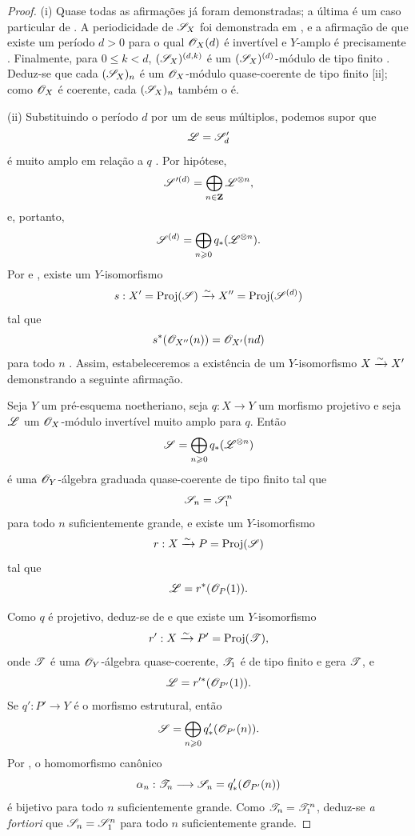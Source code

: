 \begin{proof}
(i) Quase todas as afirmações já foram demonstradas; a última é um caso particular de .
A periodicidade de $\mathscr{S}_X$ foi demonstrada em , e a afirmação de que existe um período $d>0$ para o qual $\mathscr{O}_X(d)$ é invertível e $Y$-amplo é precisamente .
Finalmente, para $0\leq k<d$, $(\mathscr{S}_X)^{(d,k)}$ é um $(\mathscr{S}_X)^{(d)}$-módulo de tipo finito .
Deduz-se que cada $(\mathscr{S}_X)_n$ é um $\mathscr{O}_X$-módulo quase-coerente de tipo finito [ii]; como $\mathscr{O}_X$ é coerente, cada $(\mathscr{S}_X)_n$ também o é.

(ii) Substituindo o período $d$ por um de seus múltiplos, podemos supor que
\[
  \mathscr{L}=\mathscr{S}'_d
\]
é muito amplo em relação a $q$ .
Por hipótese,
\[
  \mathscr{S}'^{(d)}
  =\bigoplus_{n\in\mathbf{Z}}\mathscr{L}^{\otimes n},
\]
e, portanto,
\[
  \mathscr{S}^{(d)}
  =\bigoplus_{n\geqslant0}q_*(\mathscr{L}^{\otimes n}).
\]
Por  e , existe um $Y$-isomorfismo
\[
  s:X'=\operatorname{Proj}(\mathscr{S})\xrightarrow{\sim}
  X''=\operatorname{Proj}(\mathscr{S}^{(d)})
\]
tal que
\[
  s^*(\mathscr{O}_{X''}(n))=\mathscr{O}_{X'}(nd)
\]
para todo $n$ .
Assim, estabeleceremos a existência de um $Y$-isomorfismo $X\xrightarrow{\sim} X'$ demonstrando a seguinte afirmação.

\begin{env}[2.3.4.1]
\label{III.2.3.4.1}
Seja $Y$ um pré-esquema noetheriano, seja $q:X\to Y$ um morfismo projetivo e seja $\mathscr{L}$ um $\mathscr{O}_X$-módulo invertível muito amplo para $q$.
Então
\[
  \mathscr{S}=\bigoplus_{n\geqslant0}q_*(\mathscr{L}^{\otimes n})
\]
é uma $\mathscr{O}_Y$-álgebra graduada quase-coerente de tipo finito tal que
\[
  \mathscr{S}_n=\mathscr{S}_1^n
\]
para todo $n$ suficientemente grande, e existe um $Y$-isomorfismo
\[
  r:X\xrightarrow{\sim} P=\operatorname{Proj}(\mathscr{S})
\]
tal que
\[
  \mathscr{L}=r^*(\mathscr{O}_P(1)).
\]
\end{env}

Como $q$ é projetivo, deduz-se de  e  que existe um $Y$-isomorfismo
\[
  r':X\xrightarrow{\sim} P'=\operatorname{Proj}(\mathscr{T}),
\]
onde $\mathscr{T}$ é uma $\mathscr{O}_Y$-álgebra quase-coerente, $\mathscr{T}_1$ é de tipo finito e gera $\mathscr{T}$, e
\[
  \mathscr{L}=r'^*(\mathscr{O}_{P'}(1)).
\]
Se $q':P'\to Y$ é o morfismo estrutural, então
\[
  \mathscr{S}=\bigoplus_{n\geqslant0}q'_*(\mathscr{O}_{P'}(n)).
\]
Por , o homomorfismo canônico
\[
  \alpha_n:\mathscr{T}_n\longrightarrow
  \mathscr{S}_n=q'_*(\mathscr{O}_{P'}(n))
\]
é bijetivo para todo $n$ suficientemente grande.
Como $\mathscr{T}_n=\mathscr{T}_1^n$, deduz-se \emph{a fortiori} que $\mathscr{S}_n=\mathscr{S}_1^n$ para todo $n$ suficientemente grande.


\end{proof}
